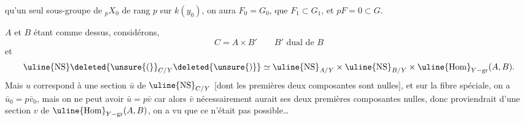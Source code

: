qu'un seul sous-groupe  de ${}_pX_0$ de rang $p$ sur $k(y_0)$, on aura $F_0=G_0$,  que $F_1\subset G_1$, et $pF=0\subset G$.

$A$ et $B$ étant comme dessus, considérons,
\[
C=A\times B'\qquad B'\text{ dual de }B
\]
et
\[
\uline{\operatorname{NS}}\deleted{\unsure{(}}_{C/Y}\deleted{\unsure{)}}\simeq\uline{\operatorname{NS}}_{A/Y}\times\uline{\operatorname{NS}}_{B/Y}\times\uline{\operatorname{Hom}}_{Y-\mathrm{gr}}(A,B).
\]
Mais $u$ correspond à une section $\bar u$ de $\uline{\operatorname{NS}}_{C/Y}$ [dont les premières deux composantes sont nulles], et sur la fibre  spéciale, on a $\bar u_0=p\bar v_0$, mais on ne peut avoir $\bar u=p\bar v$ car alors $\bar v$ nécessairement aurait ses deux premières composantes nulles, donc proviendrait d'une section $v$ de $\uline{\operatorname{Hom}}_{Y-\mathrm{gr}}(A,B)$, on a vu que ce n'était pas possible\ldots
{}
